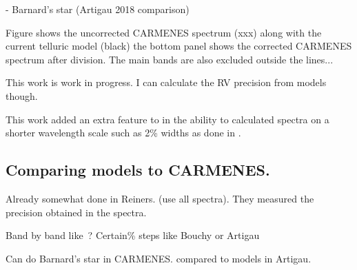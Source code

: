 - Barnard's star (Artigau 2018 comparison)

Figure \citep{} shows the uncorrected {CARMENES} spectrum (xxx) along with the current telluric model (black) the bottom panel shows the corrected {CARMENES} spectrum after division.
The main \nir{}  bands are also excluded outside the lines...


This work is work in progress.
{I can calculate the {RV} precision from models though.}




This work added an extra feature to \eniric{} in the ability to calculated spectra on a shorter wavelength scale such as 2\% widths as done in \citep{artigau_optical_2018}.


\subsection{Comparing models to {CARMENES}.}
Already somewhat done in Reiners.
(use all spectra).
They measured the precision obtained in the spectra.

Band by band like~\citet{figueira_radial_2016}?
Certain\% steps like Bouchy or Artigau


Can do Barnard's star in {CARMENES}.
 compared to models in Artigau.


%

%
%